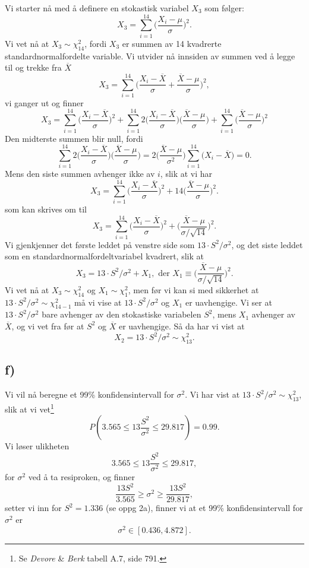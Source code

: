 \documentclass[a4paper, 11pt, titlepage, english]{article}
\begin{document}
Vi starter nå med å definere en stokastisk variabel $X_3$ som følger:
$$X_3 = \sum_{i=1}^{14} \bigg(\frac{X_i - \mu}{\sigma}\bigg)^2.$$
Vi vet nå at $X_3\sim\chi^2_{14}$, fordi $X_3$ er summen av 14 kvadrerte standardnormalfordelte variable. Vi utvider nå innsiden av summen ved å legge til og trekke fra $\overline{X}$
$$X_3 = \sum_{i=1}^{14} \bigg(\frac{X_i - \overline{X}}{\sigma} + \frac{\overline{X} - \mu}{\sigma}\bigg)^2,$$
vi ganger ut og finner
$$X_3 =  \sum_{i=1}^{14} \bigg(\frac{X_i - \overline{X}}{\sigma}\bigg)^2 + \sum_{i=1}^{14} 2\bigg(\frac{X_i - \overline{X}}{\sigma}\bigg)\bigg(\frac{\overline{X} - \mu}{\sigma}\bigg) +\sum_{i=1}^{14} \bigg(\frac{\overline{X} - \mu}{\sigma}\bigg)^2$$
Den midterste summen blir null, fordi
$$ \sum_{i=1}^{14} 2\bigg(\frac{X_i - \overline{X}}{\sigma}\bigg)\bigg(\frac{\overline{X} - \mu}{\sigma}\bigg) = 2 \bigg(\frac{\overline{X} - \mu}{\sigma^2}\bigg)\sum_{i=1}^{14} \big(X_i - \overline{X}\big) = 0.$$
Mens den siste summen avhenger ikke av $i$, slik at vi har
$$X_3 =  \sum_{i=1}^{14} \bigg(\frac{X_i - \overline{X}}{\sigma}\bigg)^2 + 14\bigg(\frac{\overline{X} - \mu}{\sigma}\bigg)^2.$$
som kan skrives om til
$$X_3 =  \sum_{i=1}^{14} \bigg(\frac{X_i - \overline{X}}{\sigma}\bigg)^2 + \bigg(\frac{\overline{X} - \mu}{\sigma/\sqrt{14}}\bigg)^2.$$
Vi gjenkjenner det første leddet på venstre side som $13\cdot S^2/\sigma^2$, og det siste leddet som en standardnormalfordeltvariabel kvadrert, slik at
$$X_3 = 13\cdot S^2/\sigma^2 + X_1, \mbox{ der } X_1 \equiv \bigg(\frac{\overline{X} - \mu}{\sigma/\sqrt{14}}\bigg)^2.$$
Vi vet nå at $X_3 \sim \chi^2_{14}$ og $X_1\sim \chi^2_1$, men før vi kan si med sikkerhet at $13\cdot S^2/\sigma^2 \sim \chi^2_{14-1}$ må vi vise at $13\cdot S^2/\sigma^2$ og $X_1$ er uavhengige. Vi ser at $13\cdot S^2/\sigma^2$ bare avhenger av den stokastiske variabelen $S^2$, mens $X_1$ avhenger av $\overline{X}$, og vi vet fra før at $S^2$ og $\overline{X}$ er uavhengige. Så da har vi vist at
$$X_2 = 13\cdot S^2/\sigma^2 \sim \chi^2_{13}.$$


\subsection*{f)}
Vi vil nå beregne et 99\% konfidensintervall for $\sigma^2$. Vi har vist at $13\cdot S^2/\sigma^2 \sim \chi^2_{13}$, slik at vi vet\footnote{Se \emph{Devore} \& \emph{Berk} tabell A.7, side 791.}
$$P(3.565\leq13\frac{S^2}{\sigma^2}\leq 29.817) = 0.99.$$
Vi løser ulikheten
$$3.565\leq13\frac{S^2}{\sigma^2}\leq 29.817,$$
for $\sigma^2$ ved å ta resiproken, og finner
$$\frac{13S^2}{3.565} \geq \sigma^2 \geq \frac{13S^2}{29.817},$$
setter vi inn for $S^2 = 1.336$ (se oppg 2a), finner vi at et 99\% konfidensintervall for $\sigma^2$ er
$$\sigma^2 \in [0.436, 4.872].$$
\end{document}

